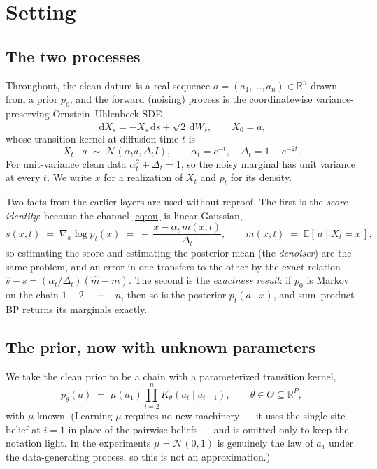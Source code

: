 \documentclass[11pt]{article}
\theoremstyle{remark}
\newcommand{\R}{\mathbb{R}}
\newcommand{\E}{\mathbb{E}}
\newcommand{\Normal}{\mathcal{N}}
\newcommand{\dd}{\,\mathrm{d}}
\begin{document}
\section{Setting}
\label{sec:setting}

\subsection{The two processes}

Throughout, the clean datum is a real sequence $a = (a_1,\dots,a_n) \in \R^n$
drawn from a prior $p_0$, and the forward (noising) process is the
coordinatewise variance-preserving Ornstein--Uhlenbeck SDE
\begin{equation}
  \dd X_s = -X_s \dd s + \sqrt{2}\dd W_s, \qquad X_0 = a,
\end{equation}
whose transition kernel at diffusion time $t$ is
\begin{equation}
  X_t \mid a \;\sim\; \Normal(\alpha_t a, \Delta_t I),
  \qquad
  \alpha_t = e^{-t}, \quad \Delta_t = 1 - e^{-2t}.
  \label{eq:ou}
\end{equation}
For unit-variance clean data $\alpha_t^2 + \Delta_t = 1$, so the noisy marginal
has unit variance at every $t$. We write $x$ for a realization of $X_t$ and
$p_t$ for its density.

Two facts from the earlier layers are used without reproof. The first is the
\emph{score identity}: because the channel \eqref{eq:ou} is linear-Gaussian,
\begin{equation}
  s(x,t) \;=\; \nabla_x \log p_t(x)
  \;=\; -\,\frac{x - \alpha_t\, m(x,t)}{\Delta_t},
  \qquad
  m(x,t) \;=\; \E[\,a \mid X_t = x\,],
  \label{eq:score-identity}
\end{equation}
so estimating the score and estimating the posterior mean (the
\emph{denoiser}) are the same problem, and an error in one transfers to the
other by the exact relation
$\hat s - s = (\alpha_t/\Delta_t)(\hat m - m)$.
The second is the \emph{exactness result}: if $p_0$ is Markov on the chain
$1 - 2 - \cdots - n$, then so is the posterior $p_t(a\mid x)$, and sum--product
BP returns its marginals exactly.

\subsection{The prior, now with unknown parameters}

We take the clean prior to be a chain with a parameterized transition kernel,
\begin{equation}
  p_\theta(a) \;=\; \mu(a_1) \prod_{i=2}^{n} K_\theta(a_i \mid a_{i-1}),
  \qquad \theta \in \Theta \subseteq \R^P,
  \label{eq:prior}
\end{equation}
with $\mu$ known. (Learning $\mu$ requires no new machinery --- it uses the
single-site belief at $i=1$ in place of the pairwise beliefs --- and is omitted
only to keep the notation light. In the experiments $\mu = \Normal(0,1)$ is
genuinely the law of $a_1$ under the data-generating process, so this is not an
approximation.)
\end{document}
